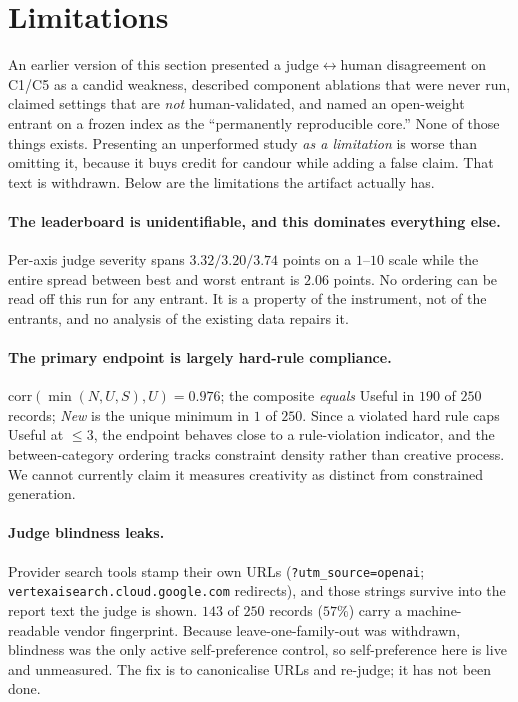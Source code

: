 \section{Limitations}
\label{sec:limitations}

An earlier version of this section presented a judge$\leftrightarrow$human disagreement on C1/C5 as a
candid weakness, described component ablations that were never run, claimed settings that are
\emph{not} human-validated, and named an open-weight entrant on a frozen index as the ``permanently
reproducible core.'' None of those things exists. Presenting an unperformed study \emph{as a limitation} is worse than omitting it, because it
buys credit for candour while adding a false claim. That text is withdrawn. Below are the limitations
the artifact actually has.

\paragraph{The leaderboard is unidentifiable, and this dominates everything else.} Per-axis judge
severity spans $3.32/3.20/3.74$ points on a $1$--$10$ scale while the entire spread between best and
worst entrant is $2.06$ points. No ordering can be read off this run for any entrant. It is a property
of the instrument, not of the entrants, and no analysis of the existing data repairs it.

\paragraph{The primary endpoint is largely hard-rule compliance.} $\mathrm{corr}(\min(N,U,S), U) =
0.976$; the composite \emph{equals} Useful in $190$ of $250$ records; \emph{New} is the unique minimum
in $1$ of $250$. Since a violated hard rule caps Useful at ${\leq}3$, the endpoint behaves close to a
rule-violation indicator, and the between-category ordering tracks constraint density rather than
creative process. We cannot currently claim it measures creativity as distinct from constrained
generation.

\paragraph{Judge blindness leaks.} Provider search tools stamp their own URLs
(\texttt{?utm\_source=openai}; \texttt{vertexaisearch.cloud.google.com} redirects), and those strings
survive into the report text the judge is shown. $143$ of $250$ records ($57\%$) carry a
machine-readable vendor fingerprint. Because leave-one-family-out was withdrawn, blindness was the
only active self-preference control, so self-preference here is live and unmeasured. The fix is to
canonicalise URLs and re-judge; it has not been done.

